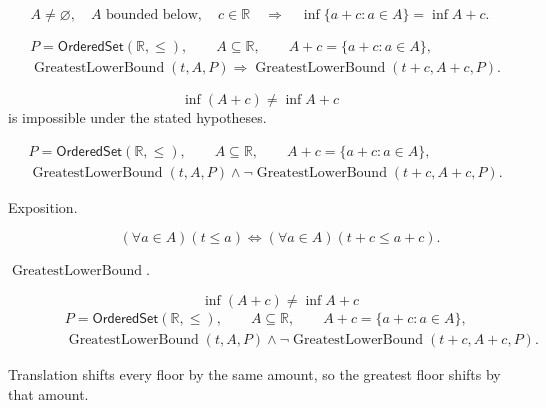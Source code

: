 \begin{remark*}
\[
A\neq\varnothing,\quad A\text{ bounded below},\quad c\in\mathbb{R}
\quad\Longrightarrow\quad
\inf\{a+c:a\in A\}=\inf A+c.
\]
\end{remark*}

\begin{remark*}
\[
\begin{aligned}
&P=\mathsf{OrderedSet}(\mathbb{R},\leq),\qquad A\subseteq\mathbb{R},\qquad A+c=\{a+c:a\in A\},\\
&\operatorname{GreatestLowerBound}(t,A,P)
\Longrightarrow
\operatorname{GreatestLowerBound}(t+c,A+c,P).
\end{aligned}
\]
\end{remark*}

\begin{remark*}
\[
\inf(A+c)\neq\inf A+c
\]
is impossible under the stated hypotheses.
\end{remark*}

\begin{remark*}
\[
\begin{aligned}
&P=\mathsf{OrderedSet}(\mathbb{R},\leq),\qquad A\subseteq\mathbb{R},\qquad A+c=\{a+c:a\in A\},\\
&\operatorname{GreatestLowerBound}(t,A,P)\land
\neg\operatorname{GreatestLowerBound}(t+c,A+c,P).
\end{aligned}
\]
\end{remark*}

\begin{remark*}
\begin{description}
  \item[Exposition.]
\[
(\forall a\in A)(t\leq a)
\Longleftrightarrow
(\forall a\in A)(t+c\leq a+c).
\]


  \item[\(\operatorname{GreatestLowerBound}.\)]
  \[
\inf(A+c)\neq\inf A+c
\]
\[
\begin{aligned}
&P=\mathsf{OrderedSet}(\mathbb{R},\leq),\qquad A\subseteq\mathbb{R},\qquad A+c=\{a+c:a\in A\},\\
&\operatorname{GreatestLowerBound}(t,A,P)\land
\neg\operatorname{GreatestLowerBound}(t+c,A+c,P).
\end{aligned}
\]
\end{description}
\end{remark*}

\begin{remark*}[Interpretation]
Translation shifts every floor by the same amount, so the greatest floor shifts
by that amount.
\end{remark*}

